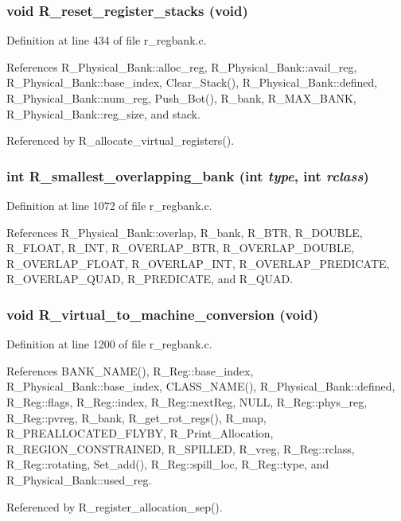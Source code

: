 \subsubsection{\setlength{\rightskip}{0pt plus 5cm}void R\_\-reset\_\-register\_\-stacks (void)}\label{r__regbank_8c_ae2564b03360930948686a839eef4411}




Definition at line 434 of file r\_\-regbank.c.

References R\_\-Physical\_\-Bank::alloc\_\-reg, R\_\-Physical\_\-Bank::avail\_\-reg, R\_\-Physical\_\-Bank::base\_\-index, Clear\_\-Stack(), R\_\-Physical\_\-Bank::defined, R\_\-Physical\_\-Bank::num\_\-reg, Push\_\-Bot(), R\_\-bank, R\_\-MAX\_\-BANK, R\_\-Physical\_\-Bank::reg\_\-size, and stack.

Referenced by R\_\-allocate\_\-virtual\_\-registers().
\subsubsection{\setlength{\rightskip}{0pt plus 5cm}int R\_\-smallest\_\-overlapping\_\-bank (int {\em type}, int {\em rclass})}\label{r__regbank_8c_d2992e99e47a9f04a944495a1d6c3853}




Definition at line 1072 of file r\_\-regbank.c.

References R\_\-Physical\_\-Bank::overlap, R\_\-bank, R\_\-BTR, R\_\-DOUBLE, R\_\-FLOAT, R\_\-INT, R\_\-OVERLAP\_\-BTR, R\_\-OVERLAP\_\-DOUBLE, R\_\-OVERLAP\_\-FLOAT, R\_\-OVERLAP\_\-INT, R\_\-OVERLAP\_\-PREDICATE, R\_\-OVERLAP\_\-QUAD, R\_\-PREDICATE, and R\_\-QUAD.
\subsubsection{\setlength{\rightskip}{0pt plus 5cm}void R\_\-virtual\_\-to\_\-machine\_\-conversion (void)}\label{r__regbank_8c_efdb477fe2fdbfe172b1e38da10b2279}




Definition at line 1200 of file r\_\-regbank.c.

References BANK\_\-NAME(), R\_\-Reg::base\_\-index, R\_\-Physical\_\-Bank::base\_\-index, CLASS\_\-NAME(), R\_\-Physical\_\-Bank::defined, R\_\-Reg::flags, R\_\-Reg::index, R\_\-Reg::next\-Reg, NULL, R\_\-Reg::phys\_\-reg, R\_\-Reg::pvreg, R\_\-bank, R\_\-get\_\-rot\_\-regs(), R\_\-map, R\_\-PREALLOCATED\_\-FLYBY, R\_\-Print\_\-Allocation, R\_\-REGION\_\-CONSTRAINED, R\_\-SPILLED, R\_\-vreg, R\_\-Reg::rclass, R\_\-Reg::rotating, Set\_\-add(), R\_\-Reg::spill\_\-loc, R\_\-Reg::type, and R\_\-Physical\_\-Bank::used\_\-reg.

Referenced by R\_\-register\_\-allocation\_\-sep().